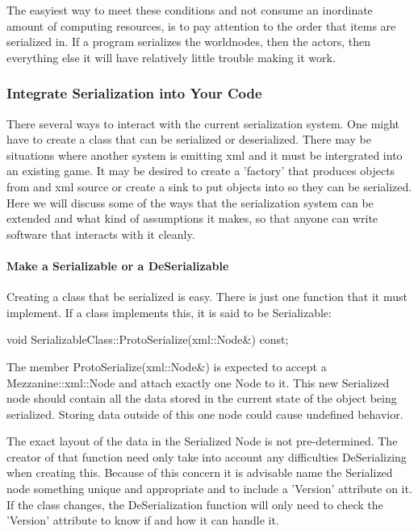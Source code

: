 The easyiest way to meet these conditions and not consume an inordinate amount of computing resources, is to pay attention to the order that items are serialized in. If a program serializes the worldnodes, then the actors, then everything else it will have relatively little trouble making it work. \hypertarget{Serialization_serializationintegration}{}\subsubsection{Integrate Serialization into Your Code}\label{Serialization_serializationintegration}
There several ways to interact with the current serialization system. One might have to create a class that can be serialized or deserialized. There may be situations where another system is emitting xml and it must be intergrated into an existing game. It may be desired to create a 'factory' that produces objects from and xml source or create a sink to put objects into so they can be serialized. Here we will discuss some of the ways that the serialization system can be extended and what kind of assumptions it makes, so that anyone can write software that interacts with it cleanly. \hypertarget{Serialization_serializationmaking}{}\paragraph{Make a Serializable or a DeSerializable}\label{Serialization_serializationmaking}
Creating a class that be serialized is easy. There is just one function that it must implement. If a class implements this, it is said to be Serializable: 
\begin{DoxyCode}
 void SerializableClass::ProtoSerialize(xml::Node&) const;
\end{DoxyCode}
 The member ProtoSerialize(xml::Node\&) is expected to accept a Mezzanine::xml::Node and attach exactly one Node to it. This new Serialized node should contain all the data stored in the current state of the object being serialized. Storing data outside of this one node could cause undefined behavior. \par
 \par
 The exact layout of the data in the Serialized Node is not pre-\/determined. The creator of that function need only take into account any difficulties DeSerializing when creating this. Because of this concern it is advisable name the Serialized node something unique and appropriate and to include a 'Version' attribute on it. If the class changes, the DeSerialization function will only need to check the 'Version' attribute to know if and how it can handle it. \par
